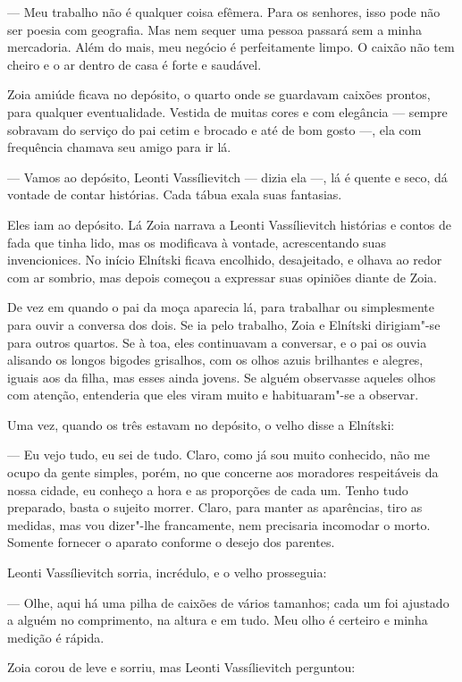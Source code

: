 --- Meu trabalho não é qualquer coisa efêmera. Para os senhores, isso
pode não ser poesia com geografia. Mas nem sequer uma pessoa passará sem
a minha mercadoria. Além do mais, meu negócio é perfeitamente limpo. O
caixão não tem cheiro e o ar dentro de casa é forte e saudável.

Zoia amiúde ficava no depósito, o quarto onde se guardavam caixões
prontos, para qualquer eventualidade. Vestida de muitas cores e com
elegância --- sempre sobravam do serviço do pai cetim e brocado e até de
bom gosto ---, ela com frequência chamava seu amigo para ir lá.

--- Vamos ao depósito, Leonti Vassílievitch --- dizia ela ---, lá é
quente e seco, dá vontade de contar histórias. Cada tábua exala suas
fantasias.

Eles iam ao depósito. Lá Zoia narrava a Leonti Vassílievitch histórias e
contos de fada que tinha lido, mas os modificava à vontade, acrescentando
suas invencionices. No início Elnítski ficava encolhido, desajeitado, e
olhava ao redor com ar sombrio, mas depois começou a expressar suas
opiniões diante de Zoia.

De vez em quando o pai da moça aparecia lá, para trabalhar ou
simplesmente para ouvir a conversa dos dois. Se ia pelo trabalho, Zoia e
Elnítski dirigiam"-se para outros quartos. Se à toa, eles continuavam a
conversar, e o pai os ouvia alisando os longos bigodes grisalhos, com os
olhos azuis brilhantes e alegres, iguais aos da filha, mas esses ainda
jovens. Se alguém observasse aqueles olhos com atenção, entenderia que
eles viram muito e habituaram"-se a observar.

Uma vez, quando os três estavam no depósito, o velho disse a Elnítski:

--- Eu vejo tudo, eu sei de tudo. Claro, como já sou muito conhecido,
não me ocupo da gente simples, porém, no que concerne aos moradores
respeitáveis da nossa cidade, eu conheço a hora e as proporções de cada
um. Tenho tudo preparado, basta o sujeito morrer. Claro, para manter as
aparências, tiro as medidas, mas vou dizer"-lhe francamente, nem
precisaria incomodar o morto. Somente fornecer o aparato conforme o
desejo dos parentes.

Leonti Vassílievitch sorria, incrédulo, e o velho prosseguia:

--- Olhe, aqui há uma pilha de caixões de vários tamanhos; cada um foi
ajustado a alguém no comprimento, na altura e em tudo. Meu olho é
certeiro e minha medição é rápida.

Zoia corou de leve e sorriu, mas Leonti Vassílievitch perguntou:

